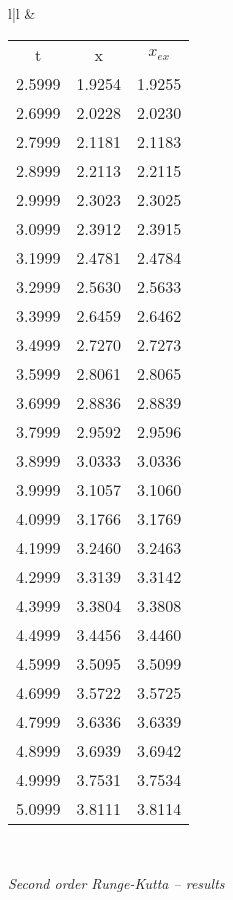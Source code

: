 \begin{figure}
\begin{tabular}{l|l}
&
        \begin{tabular}{ccc}
            \multicolumn{1}{c}{t} &  \multicolumn{1}{c}{x}  & \multicolumn{1}{c}{$x_{ex}$}\\
            2.5999 & 1.9254 & 1.9255 \\ 
            2.6999 & 2.0228 & 2.0230 \\ 
            2.7999 & 2.1181 & 2.1183 \\ 
            2.8999 & 2.2113 & 2.2115 \\ 
            2.9999 & 2.3023 & 2.3025 \\ 
            3.0999 & 2.3912 & 2.3915 \\ 
            3.1999 & 2.4781 & 2.4784 \\ 
            3.2999 & 2.5630 & 2.5633 \\ 
            3.3999 & 2.6459 & 2.6462 \\ 
            3.4999 & 2.7270 & 2.7273 \\ 
            3.5999 & 2.8061 & 2.8065 \\ 
            3.6999 & 2.8836 & 2.8839 \\ 
            3.7999 & 2.9592 & 2.9596 \\ 
            3.8999 & 3.0333 & 3.0336 \\ 
            3.9999 & 3.1057 & 3.1060 \\ 
            4.0999 & 3.1766 & 3.1769 \\ 
            4.1999 & 3.2460 & 3.2463 \\ 
            4.2999 & 3.3139 & 3.3142 \\ 
            4.3999 & 3.3804 & 3.3808 \\ 
            4.4999 & 3.4456 & 3.4460 \\ 
            4.5999 & 3.5095 & 3.5099 \\ 
            4.6999 & 3.5722 & 3.5725 \\ 
            4.7999 & 3.6336 & 3.6339 \\ 
            4.8999 & 3.6939 & 3.6942 \\ 
            4.9999 & 3.7531 & 3.7534 \\ 
            5.0999 & 3.8111 & 3.8114 \\ 
        \end{tabular}
        \\
\end{tabular}
    \caption{\textit{Second order Runge-Kutta -- results}}
    \label{fig:06_08}
\end{figure}


